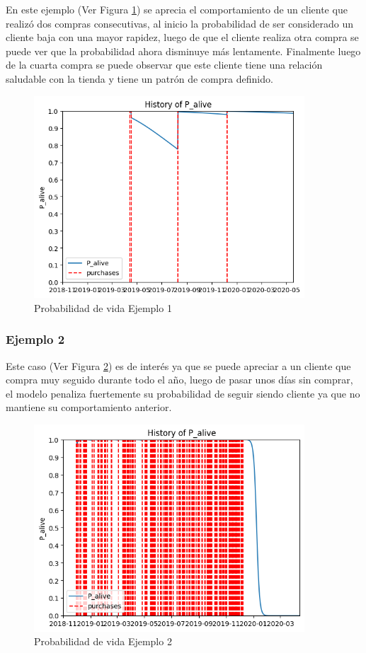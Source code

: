 En este ejemplo (Ver Figura \ref{fig:e1}) se aprecia el comportamiento de un cliente que realizó dos compras consecutivas, al inicio la probabilidad de ser considerado un cliente baja con una mayor rapidez, luego de que el cliente realiza otra compra se puede ver que la probabilidad ahora disminuye más lentamente. Finalmente luego de la cuarta compra se puede observar que este cliente tiene una relación saludable con la tienda y tiene un patrón de compra definido.

\begin{figure}[H]
	\centering \includegraphics[width=0.90\textwidth]{images/e1.png}
	\caption{Probabilidad de vida Ejemplo 1}
	\label{fig:e1}
\end{figure}

\subsubsection{Ejemplo 2}

Este caso (Ver Figura \ref{fig:e3}) es de interés ya que se puede apreciar a un cliente que compra muy seguido durante todo el año, luego de pasar unos días sin comprar, el modelo penaliza fuertemente su probabilidad de seguir siendo cliente ya que no mantiene su comportamiento anterior.

\begin{figure}[H]
	\centering \includegraphics[width=0.90\textwidth]{images/e3.png}
	\caption{Probabilidad de vida Ejemplo 2}
	\label{fig:e3}
\end{figure}

